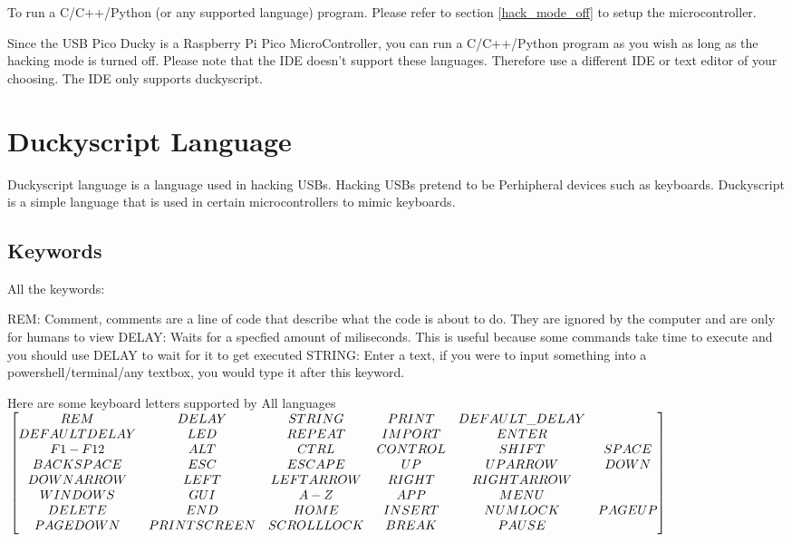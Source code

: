 \documentclass[a4paper,12pt]{article}
\begin{document}
To run a C/C++/Python (or any supported language) program. Please refer to section \ref{hack_mode_off} to setup the microcontroller.

Since the USB Pico Ducky is a Raspberry Pi Pico MicroController, you can run a C/C++/Python program as you wish as long as the hacking mode is turned off. Please note that the IDE doesn't support these languages. Therefore use a different IDE or text editor of your choosing. The IDE only supports duckyscript.

\section{Duckyscript Language}

Duckyscript language is a language used in hacking USBs. Hacking USBs pretend to be Perhipheral devices such as keyboards. Duckyscript is a simple language that is used in certain microcontrollers to mimic keyboards.

\subsection{Keywords}\label{all_keywords}

All the keywords:

REM: Comment, comments are a line of code that describe what the code is about to do. They are ignored by the computer and are only for humans to view
DELAY: Waits for a specfied amount of miliseconds. This is useful because some commands take time to execute and you should use DELAY to wait for it to get executed
STRING: Enter a text, if you were to input something into a powershell/terminal/any textbox, you would type it after this keyword.

Here are some keyboard letters supported by All languages
\scriptsize
$\\\begin{bmatrix} 
REM & DELAY & STRING & PRINT & DEFAULT\_DELAY
\\DEFAULTDELAY & LED & REPEAT & IMPORT & ENTER
\\F1-F12 & ALT & CTRL & CONTROL & SHIFT & SPACE
\\BACKSPACE & ESC & ESCAPE & UP & UPARROW & DOWN
\\DOWNARROW & LEFT & LEFTARROW & RIGHT & RIGHTARROW
\\WINDOWS & GUI & A-Z & APP & MENU
\\DELETE & END & HOME & INSERT & NUMLOCK & PAGEUP
\\PAGEDOWN & PRINTSCREEN & SCROLLLOCK & BREAK & PAUSE
\end{bmatrix}\\\\$
\normalsize
\end{document}
